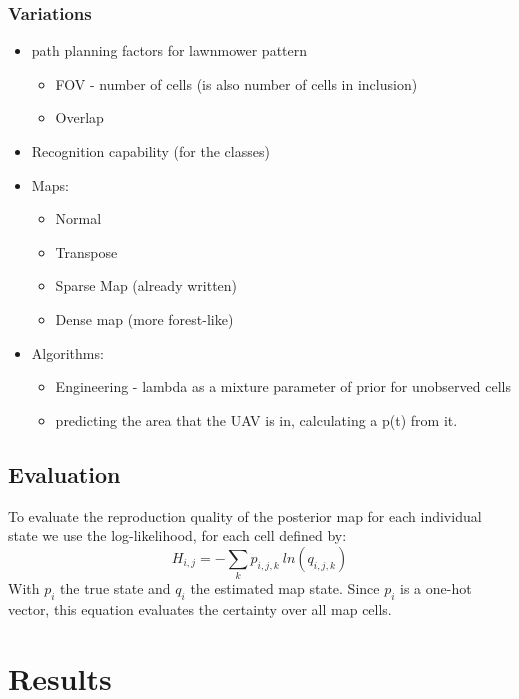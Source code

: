 \documentclass[twocolumn,letterpaper]{IEEEAerospaceCLS}  %
\begin{document}
\subsubsection{Variations}
\begin{itemize}
    \item path planning factors for lawnmower pattern
    \begin{itemize}
        \item FOV - number of cells (is also number of cells in inclusion)
        \item Overlap
    \end{itemize}
    \item Recognition capability (for the classes)
    \item Maps:
    \begin{itemize}
        \item Normal
        \item Transpose
        \item Sparse Map (already written)
        \item Dense map (more forest-like)
    \end{itemize}
    \item Algorithms:
    \begin{itemize}
        \item Engineering - lambda as a mixture parameter of prior for unobserved cells 
        \item predicting the area that the UAV is in, calculating a p(t) from it.
    \end{itemize}
\end{itemize}
\subsection{Evaluation}\label{subsec:MetEval}
To evaluate the reproduction quality of the posterior map for each individual state we use the log-likelihood, for each cell defined by:
\begin{equation}
    H_{i,j} = - \sum_{k} p_{i,j,k}~ln(q_{i,j,k})
\end{equation}
With $p_i$ the true state and $q_i$ the estimated map state. Since $p_i$ is a one-hot vector, this equation evaluates the certainty over all map cells.
\section{Results} \label{sec:Results}
\end{document}
